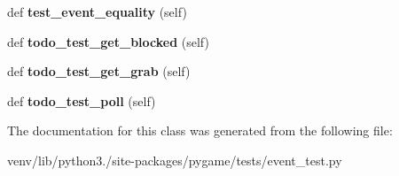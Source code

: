 \begin{DoxyCompactItemize}
def {\bfseries test\+\_\+event\+\_\+equality} (self)
\item 
\mbox{\label{classpygame_1_1tests_1_1event__test_1_1_event_module_test_a63d4c19225c3467b9aab1f6b9a8bf81f}} 
def {\bfseries todo\+\_\+test\+\_\+get\+\_\+blocked} (self)
\item 
\mbox{\label{classpygame_1_1tests_1_1event__test_1_1_event_module_test_ada049457c7e180aeeb196a5350d8c066}} 
def {\bfseries todo\+\_\+test\+\_\+get\+\_\+grab} (self)
\item 
\mbox{\label{classpygame_1_1tests_1_1event__test_1_1_event_module_test_ae76b8dcf3e953946ef9e312711f933ca}} 
def {\bfseries todo\+\_\+test\+\_\+poll} (self)
\end{DoxyCompactItemize}


The documentation for this class was generated from the following file\+:\begin{DoxyCompactItemize}
\item 
venv/lib/python3./site-\/packages/pygame/tests/event\+\_\+test.\+py\end{DoxyCompactItemize}
